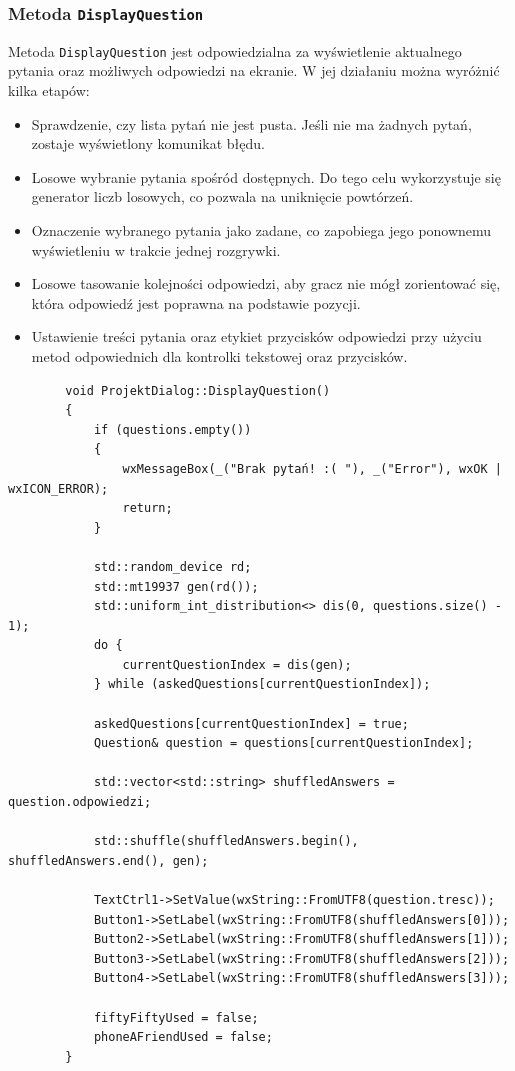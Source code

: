 \documentclass[]{article}
\begin{document}
	\subsubsection{Metoda \texttt{DisplayQuestion}}

Metoda \texttt{DisplayQuestion} jest odpowiedzialna za wyświetlenie aktualnego pytania oraz możliwych odpowiedzi na ekranie. W jej działaniu można wyróżnić kilka etapów:

\begin{itemize}
	\item Sprawdzenie, czy lista pytań nie jest pusta. Jeśli nie ma żadnych pytań, zostaje wyświetlony komunikat błędu.
	\item Losowe wybranie pytania spośród dostępnych. Do tego celu wykorzystuje się generator liczb losowych, co pozwala na uniknięcie powtórzeń.
	\item Oznaczenie wybranego pytania jako zadane, co zapobiega jego ponownemu wyświetleniu w trakcie jednej rozgrywki.
	\item Losowe tasowanie kolejności odpowiedzi, aby gracz nie mógł zorientować się, która odpowiedź jest poprawna na podstawie pozycji.
	\item Ustawienie treści pytania oraz etykiet przycisków odpowiedzi przy użyciu metod odpowiednich dla kontrolki tekstowej oraz przycisków.
\end{itemize}

	\begin{verbatim}
		void ProjektDialog::DisplayQuestion()
		{
			if (questions.empty())
			{
				wxMessageBox(_("Brak pytań! :( "), _("Error"), wxOK | wxICON_ERROR);
				return;
			}
			
			std::random_device rd;
			std::mt19937 gen(rd());
			std::uniform_int_distribution<> dis(0, questions.size() - 1);
			do {
				currentQuestionIndex = dis(gen);
			} while (askedQuestions[currentQuestionIndex]);
			
			askedQuestions[currentQuestionIndex] = true;
			Question& question = questions[currentQuestionIndex];
			
			std::vector<std::string> shuffledAnswers = question.odpowiedzi;
			
			std::shuffle(shuffledAnswers.begin(), shuffledAnswers.end(), gen);
			
			TextCtrl1->SetValue(wxString::FromUTF8(question.tresc));
			Button1->SetLabel(wxString::FromUTF8(shuffledAnswers[0]));
			Button2->SetLabel(wxString::FromUTF8(shuffledAnswers[1]));
			Button3->SetLabel(wxString::FromUTF8(shuffledAnswers[2]));
			Button4->SetLabel(wxString::FromUTF8(shuffledAnswers[3]));
			
			fiftyFiftyUsed = false;
			phoneAFriendUsed = false;
		}
	\end{verbatim}
	
\end{document}
